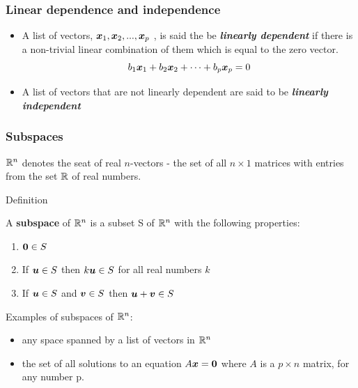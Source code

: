 \documentclass{beamer}
\begin{document}
\begin{frame}
  \frametitle{Linear dependence and independence}

\begin{itemize}

\item A list of vectors, $\bm{x}_1, \bm{x}_2, ..., \bm{x}_p$ , is said the be \emph{\textbf{linearly dependent}} if there is a non-trivial linear combination of them which is  equal to the zero vector.
\[
 b_1 \bm{x}_1 + b_2 \bm{x}_2 + \cdots + b_p \bm{x}_p = 0
\]

\item A list of vectors that are not linearly dependent are said to be \emph{\textbf{linearly independent}} 

\end{itemize}

\end{frame}





\begin{frame}
  \frametitle{Subspaces}

$\mathbb{R}^n$  denotes the seat of real $n$-vectors - the set of all $n \times 1$ matrices with entries from the set $\mathbb{R}$ of real numbers.
\medskip

\begin{block}{Definition}

A \textbf{subspace} of $\mathbb{R}^n$ is a subset S of $\mathbb{R}^n$ with the following properties:
\begin{enumerate}
	\item $\bm{0} \in S$
	\item If $\bm{u} \in S$ then $k\bm{u} \in S$ for all real numbers $k$
	\item If $\bm{u} \in S$ and  $\bm{v} \in S$ then $\bm{u} + \bm{v} \in S$
\end{enumerate}

\end{block}

Examples of subspaces of $\mathbb{R}^n$:
\begin{itemize}
	\item any space spanned by a list of vectors in $\mathbb{R}^n$
	\item the set of all solutions to an equation $A\bm{x} = \bm{0}$ where $A$ is a $p \times n$ matrix, for any number p.
\end{itemize}

\end{frame}
\end{document}

